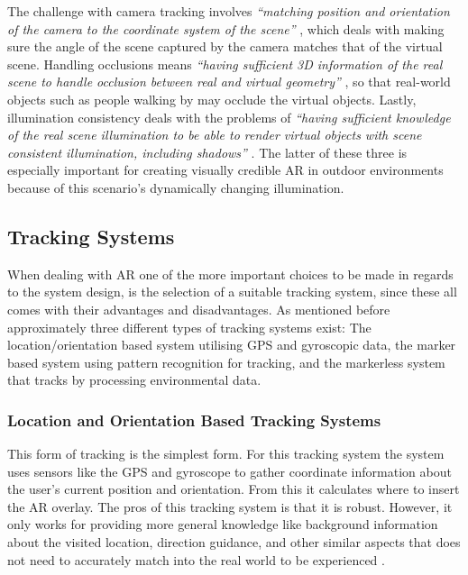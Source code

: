 The challenge with camera tracking involves \textit{“matching position and orientation of the camera to the coordinate system of the scene”} \cite{Lal2010}, which deals with making sure the angle of the scene captured by the camera matches that of the virtual scene. Handling occlusions means \textit{“having sufficient 3D information of the real scene to handle occlusion between real and virtual geometry”} \cite{Lal2010}, so that real-world objects such as people walking by may occlude the virtual objects. Lastly, illumination consistency deals with the problems of \textit{“having sufficient knowledge of the real scene illumination to be able to render virtual objects with scene consistent illumination, including shadows”} \cite{Lal2010}. The latter of these three is especially important for creating visually credible AR in outdoor environments because of this scenario’s dynamically changing illumination.

\subsection{Tracking Systems}  
When dealing with AR one of the more important choices to be made in regards to the system design, is the selection of a suitable tracking system, since these all comes with their advantages and disadvantages. As mentioned before approximately three different types of tracking systems exist: The location/orientation based system utilising GPS and gyroscopic data, the marker based system using pattern recognition for tracking, and the markerless system that tracks by processing environmental data.    

\subsubsection{Location and Orientation Based Tracking Systems}
This form of tracking is the simplest form. For this tracking system the system uses sensors like the GPS and gyroscope to gather coordinate information about the user’s current position and orientation. From this it calculates where to insert the AR overlay. The pros of this tracking system is that it is robust. However, it only works for providing more general knowledge like background information about the visited location, direction guidance, and other similar aspects that does not need to accurately match into the real world to be experienced \cite{Woodford}.

